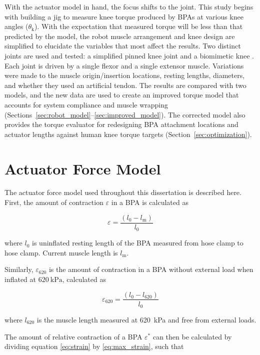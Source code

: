 With the actuator model in hand, the focus shifts to the joint. This study begins with building a jig to measure knee torque produced by BPAs at various knee angles ($\theta_\text{k}$). With the expectation that measured torque will be less than that predicted by the model, the robot muscle arrangement and knee design are simplified to elucidate the variables that most affect the results. Two distinct joints are used and tested: a simplified pinned knee joint and a biomimetic knee \citep{steele_biomimetic_2018}. Each joint is driven by a single flexor and a single extensor muscle. Variations were made to the muscle origin/insertion locations, resting lengths, diameters, and whether they used an artificial tendon. The results are compared with two models, and the new data are used to create an improved torque model that accounts for system compliance and muscle wrapping (Sections~\ref{sec:robot_model}--\ref{sec:improved_model}). The corrected model also provides the torque evaluator for redesigning BPA attachment locations and actuator lengths against human knee torque targets (Section~\ref{sec:optimization}).

\section{Actuator Force Model}\label{sec:force_model}


The actuator force model used throughout this dissertation is described here. First, the amount of contraction ${\varepsilon}$ in a BPA is calculated as

\begin{equation}
    {\varepsilon} = \frac{(l_{0}-l_\text{m})}{l_{0}} \label{eq:strain}
\end{equation}

where $l_{0}$ is uninflated resting length of the BPA measured from hose clamp to hose clamp. Current muscle length is $l_\text{m}$.

Similarly, ${\varepsilon_{620}}$ is the amount of contraction in a BPA without external load when inflated at $\qty{620}{\kPa}$, calculated as 

\begin{equation}
    \varepsilon_{620} = \frac{(l_{0}-l_{620})}{l_{0}} \label{eq:max_strain}
\end{equation}

where $l_{620}$ is the muscle length measured at \qty{620}{\kPa} and free from external loads. 

The amount of relative contraction of a BPA $\varepsilon^*$ can then be calculated by dividing equation \eqref{eq:strain} by \eqref{eq:max_strain}, such that

